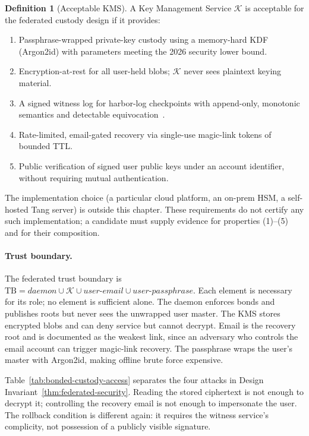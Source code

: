 \documentclass[11pt,a4paper]{article}
\theoremstyle{definition}
\newtheorem{definition}{Definition}[section]
\theoremstyle{remark}
\begin{document}
\begin{definition}[Acceptable KMS]\label{def:kms}
\setlength{\parskip}{4pt plus 1pt}
A Key Management Service $\mathcal{K}$ is acceptable for the federated custody design if it provides:
\begin{enumerate}[nosep]
  \item Passphrase-wrapped private-key custody using a memory-hard KDF (Argon2id) with parameters meeting the 2026 security lower bound.
  \item Encryption-at-rest for all user-held blobs; $\mathcal{K}$ never sees plaintext keying material.
  \item A signed witness log for harbor-log checkpoints with append-only, monotonic semantics and detectable equivocation~.
  \item Rate-limited, email-gated recovery via single-use magic-link tokens of bounded TTL.
  \item Public verification of signed user public keys under an account identifier, without requiring mutual authentication.
\end{enumerate}
\end{definition}

The implementation choice (a particular cloud platform, an on-prem HSM, a self-hosted Tang server) is outside this chapter. These requirements do not certify any such implementation; a candidate must supply evidence for properties (1)--(5) and for their composition.

\paragraph{Trust boundary.} The federated trust boundary is
$\mathrm{TB} = \mathit{daemon} \cup \mathcal{K} \cup \mathit{user{\text{-}}email} \cup \mathit{user{\text{-}}passphrase}$.
Each element is necessary for its role; no element is sufficient alone. The daemon enforces bonds and publishes roots but never sees the unwrapped user master. The KMS stores encrypted blobs and can deny service but cannot decrypt. Email is the recovery root and is documented as the weakest link, since an adversary who controls the email account can trigger magic-link recovery. The passphrase wraps the user's master with Argon2id, making offline brute force expensive.

Table~\ref{tab:bonded-custody-access} separates the four attacks in Design
Invariant~\ref{thm:federated-security}. Reading the stored ciphertext is not
enough to decrypt it; controlling the recovery email is not enough to impersonate
the user. The rollback condition is different again: it requires the witness
service's complicity, not possession of a publicly visible signature.
\end{document}
